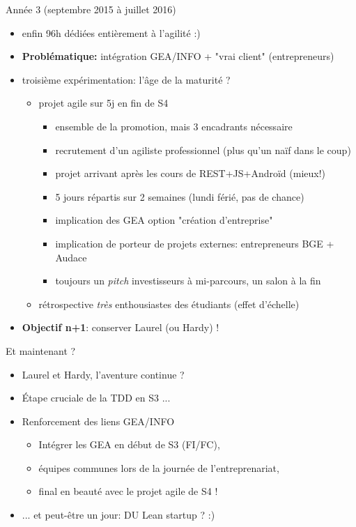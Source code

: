 \documentclass{beamer}
\begin{document}
\begin{frame}{Année 3 (septembre 2015 à juillet 2016)}
  \begin{itemize}
    \item enfin 96h dédiées entièrement à l'agilité :)
    \item \textbf{Problématique:} intégration GEA/INFO + "vrai client" (entrepreneurs) 
    \item troisième expérimentation: l'âge de la maturité ?
    \begin{itemize}
        \item projet agile sur 5j en fin de S4
        \begin{itemize}
          \item ensemble de la promotion, mais 3 encadrants nécessaire
          \item recrutement d'un agiliste professionnel (plus qu'un naïf dans le coup)
          \item projet arrivant après les cours de REST+JS+Androïd (mieux!)
          \item 5 jours répartis sur 2 semaines (lundi férié, pas de chance)
          \item implication des GEA option "création d'entreprise"
          \item implication de porteur de projets externes: entrepreneurs BGE + Audace
          \item toujours un \emph{pitch} investisseurs à mi-parcours, un salon à la fin
        \end{itemize}
        \item rétrospective \emph{très} enthousiastes des étudiants (effet d'échelle)
      \end{itemize}
      \item \textbf{Objectif n+1}: conserver Laurel (ou Hardy) !
  \end{itemize}
\end{frame}


\begin{frame}{Et maintenant ?}
  \begin{itemize}
    \item Laurel et Hardy, l'aventure continue ?
    \item \'Etape cruciale de la TDD en S3 ...
    \item Renforcement des liens GEA/INFO
      \begin{itemize}
        \item Intégrer les GEA en début de S3 (FI/FC),
        \item équipes communes lors de la journée de l'entreprenariat,
        \item final en beauté avec le projet agile de S4 !
      \end{itemize}
    \item ... et peut-être un jour: DU Lean startup ? :)
  \end{itemize}
\end{frame}
\end{document}
